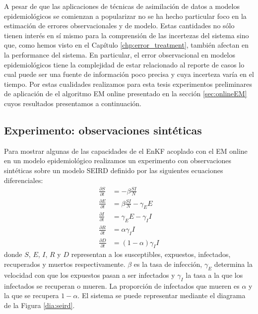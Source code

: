 A pesar de que las aplicaciones de técnicas de asimilación de datos a modelos epidemiológicos se comienzan a popularizar no se ha hecho particular foco en la estimación de errores observacionales y de modelo. Estas cantidades no sólo tienen interés en sí mismo para la comprensión de las incertezas del sistema sino que, como hemos visto en el Capítulo \ref{chp:error_treatment}, también afectan en la performance del sistema. En particular, el error observacional en modelos epidemiológicos tiene la complejidad de estar relacionado al reporte de casos lo cual puede ser una fuente de información poco precisa y cuya incerteza varía en el tiempo. Por estas cualidades realizamos para esta tesis experimentos preliminares de aplicación de el algoritmo EM online presentado en la sección \ref{sec:onlineEM} cuyos resultados presentamos a continuación.

\subsection{Experimento: observaciones sintéticas} \label{sec:online_em_seird_synthetic}
Para mostrar algunas de las capacidades de el EnKF acoplado con el EM online en un modelo epidemiológico realizamos un experimento con observaciones sintéticas sobre un modelo SEIRD definido por las siguientes ecuaciones diferenciales:
\begin{align} \label{eq:seird}
    \frac{\partial S}{\partial t} &= -\beta \frac{SI}{N}\\
    \frac{\partial E}{\partial t} &= \beta \frac{SI}{N} - \gamma_E E \\
    \frac{\partial I}{\partial t} &= \gamma_E E - \gamma_I I \\
    \frac{\partial R}{\partial t} &= \alpha \gamma_I I \\
    \frac{\partial D}{\partial t} &= (1-\alpha) \gamma_I I
\end{align}
donde $S$, $E$, $I$, $R$ y $D$ representan a los susceptibles, expuestos, infectados, recuperados y muertos respectivamente. $\beta$ es la tasa de infección, $\gamma_E$ determina la velocidad con que los expuestos pasan a ser infectados y $\gamma_I$ la tasa a la que los infectados se recuperan o mueren. La proporción de infectados que mueren es $\alpha$ y la que se recupera $1 - \alpha$. El sistema se puede representar mediante el diagrama de la Figura \ref{dia:seird}. 

